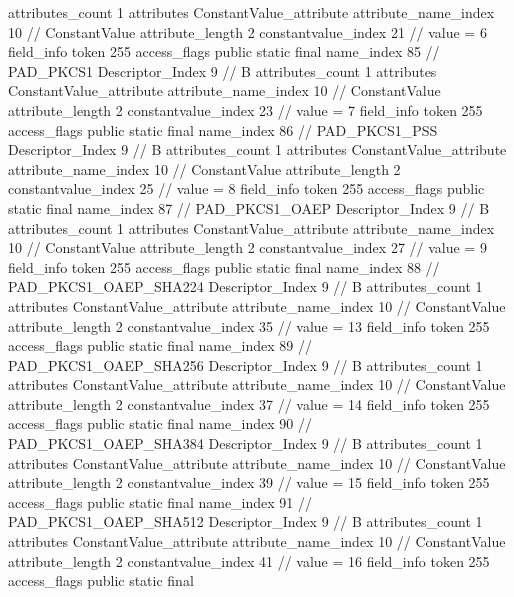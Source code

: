 {{{{{				attributes_count	1
				attributes {
				ConstantValue_attribute {
					attribute_name_index	10		// ConstantValue
					attribute_length	2
					constantvalue_index	21		// value = 6
				}
				}
			}
			field_info {
				token	255
				access_flags	public static final
				name_index	85		// PAD_PKCS1
				Descriptor_Index	9		// B
				attributes_count	1
				attributes {
				ConstantValue_attribute {
					attribute_name_index	10		// ConstantValue
					attribute_length	2
					constantvalue_index	23		// value = 7
				}
				}
			}
			field_info {
				token	255
				access_flags	public static final
				name_index	86		// PAD_PKCS1_PSS
				Descriptor_Index	9		// B
				attributes_count	1
				attributes {
				ConstantValue_attribute {
					attribute_name_index	10		// ConstantValue
					attribute_length	2
					constantvalue_index	25		// value = 8
				}
				}
			}
			field_info {
				token	255
				access_flags	public static final
				name_index	87		// PAD_PKCS1_OAEP
				Descriptor_Index	9		// B
				attributes_count	1
				attributes {
				ConstantValue_attribute {
					attribute_name_index	10		// ConstantValue
					attribute_length	2
					constantvalue_index	27		// value = 9
				}
				}
			}
			field_info {
				token	255
				access_flags	public static final
				name_index	88		// PAD_PKCS1_OAEP_SHA224
				Descriptor_Index	9		// B
				attributes_count	1
				attributes {
				ConstantValue_attribute {
					attribute_name_index	10		// ConstantValue
					attribute_length	2
					constantvalue_index	35		// value = 13
				}
				}
			}
			field_info {
				token	255
				access_flags	public static final
				name_index	89		// PAD_PKCS1_OAEP_SHA256
				Descriptor_Index	9		// B
				attributes_count	1
				attributes {
				ConstantValue_attribute {
					attribute_name_index	10		// ConstantValue
					attribute_length	2
					constantvalue_index	37		// value = 14
				}
				}
			}
			field_info {
				token	255
				access_flags	public static final
				name_index	90		// PAD_PKCS1_OAEP_SHA384
				Descriptor_Index	9		// B
				attributes_count	1
				attributes {
				ConstantValue_attribute {
					attribute_name_index	10		// ConstantValue
					attribute_length	2
					constantvalue_index	39		// value = 15
				}
				}
			}
			field_info {
				token	255
				access_flags	public static final
				name_index	91		// PAD_PKCS1_OAEP_SHA512
				Descriptor_Index	9		// B
				attributes_count	1
				attributes {
				ConstantValue_attribute {
					attribute_name_index	10		// ConstantValue
					attribute_length	2
					constantvalue_index	41		// value = 16
				}
				}
			}
			field_info {
				token	255
				access_flags	public static final
}}}}}
